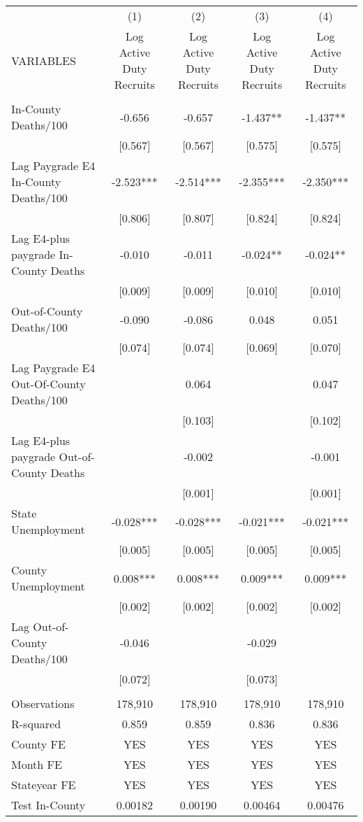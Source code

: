 \documentclass[]{article}
\begin{document}
\begin{tabular}{lcccc} \hline
 & (1) & (2) & (3) & (4) \\
VARIABLES & Log Active Duty Recruits & Log Active Duty Recruits & Log Active Duty Recruits & Log Active Duty Recruits \\ \hline
 &  &  &  &  \\
In-County Deaths/100 & -0.656 & -0.657 & -1.437** & -1.437** \\
 & [0.567] & [0.567] & [0.575] & [0.575] \\
Lag Paygrade E4 In-County Deaths/100 & -2.523*** & -2.514*** & -2.355*** & -2.350*** \\
 & [0.806] & [0.807] & [0.824] & [0.824] \\
Lag E4-plus paygrade In-County Deaths & -0.010 & -0.011 & -0.024** & -0.024** \\
 & [0.009] & [0.009] & [0.010] & [0.010] \\
Out-of-County Deaths/100 & -0.090 & -0.086 & 0.048 & 0.051 \\
 & [0.074] & [0.074] & [0.069] & [0.070] \\
Lag Paygrade E4 Out-Of-County Deaths/100 &  & 0.064 &  & 0.047 \\
 &  & [0.103] &  & [0.102] \\
Lag E4-plus paygrade Out-of-County Deaths &  & -0.002 &  & -0.001 \\
 &  & [0.001] &  & [0.001] \\
State Unemployment & -0.028*** & -0.028*** & -0.021*** & -0.021*** \\
 & [0.005] & [0.005] & [0.005] & [0.005] \\
County Unemployment & 0.008*** & 0.008*** & 0.009*** & 0.009*** \\
 & [0.002] & [0.002] & [0.002] & [0.002] \\
Lag Out-of-County Deaths/100 & -0.046 &  & -0.029 &  \\
 & [0.072] &  & [0.073] &  \\
 &  &  &  &  \\
Observations & 178,910 & 178,910 & 178,910 & 178,910 \\
R-squared & 0.859 & 0.859 & 0.836 & 0.836 \\
County FE & YES & YES & YES & YES \\
Month FE & YES & YES & YES & YES \\
Stateyear FE & YES & YES & YES & YES \\
Test In-County & 0.00182 & 0.00190 & 0.00464 & 0.00476 \\

\end{tabular}
\end{document}
